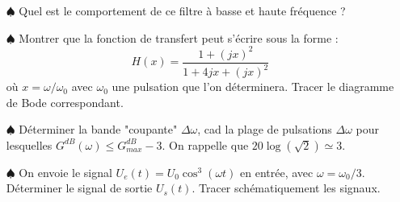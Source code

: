 \documentclass{report}
\begin{document}
\begin{itemize}

	\item[$\spadesuit$] Quel est le comportement de ce filtre à basse et haute fréquence ? 
	
	\item[$\spadesuit$] Montrer que la fonction de transfert peut s'écrire sous la forme :
	\begin{equation}
		H(x) =\frac{1+(jx)^2}{1+4jx + (jx)^2}
	\end{equation}
	où $x=\omega/\omega_0$ avec $\omega_0$ une pulsation que l'on déterminera. Tracer le diagramme de Bode correspondant. 
	
	\item[$\spadesuit$] Déterminer la bande "coupante" $\Delta\omega$, cad la plage de pulsations $\Delta\omega$ pour lesquelles $G^{dB}(\omega)\leq G^{dB}_{max} - 3$. On rappelle que $20\log\left( \sqrt{2}\right)\simeq3 $.
	
	\item[$\spadesuit$] On envoie le signal $U_e(t)=U_0\cos^3(\omega t)$ en entrée, avec $\omega=\omega_0/3$. Déterminer le signal de sortie $U_s(t)$. Tracer schématiquement les signaux.

\end{itemize}

\newpage
\end{document}
